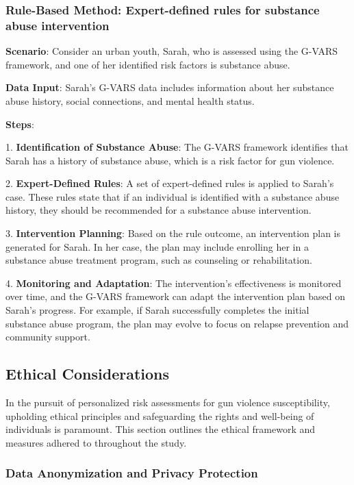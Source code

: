 \documentclass[11pt]{article}
\begin{document}
\subsubsection*{Rule-Based Method: Expert-defined rules for substance abuse intervention}

\textbf{Scenario}: Consider an urban youth, Sarah, who is assessed using the \textsf{G-VARS} framework, and one of her identified risk factors is substance abuse.

\textbf{Data Input}: Sarah's \textsf{G-VARS} data includes information about her substance abuse history, social connections, and mental health status.

\textbf{Steps}:

1. \textbf{Identification of Substance Abuse}: The \textsf{G-VARS} framework identifies that Sarah has a history of substance abuse, which is a risk factor for gun violence.

2. \textbf{Expert-Defined Rules}: A set of expert-defined rules is applied to Sarah's case. These rules state that if an individual is identified with a substance abuse history, they should be recommended for a substance abuse intervention.

3. \textbf{Intervention Planning}: Based on the rule outcome, an intervention plan is generated for Sarah. In her case, the plan may include enrolling her in a substance abuse treatment program, such as counseling or rehabilitation.

4. \textbf{Monitoring and Adaptation}: The intervention's effectiveness is monitored over time, and the \textsf{G-VARS} framework can adapt the intervention plan based on Sarah's progress. For example, if Sarah successfully completes the initial substance abuse program, the plan may evolve to focus on relapse prevention and community support.


\subsection{Ethical Considerations}\label{ethics}

In the pursuit of personalized risk assessments for gun violence susceptibility, upholding ethical principles and safeguarding the rights and well-being of individuals is paramount. This section outlines the ethical framework and measures adhered to throughout the study.

\subsubsection{Data Anonymization and Privacy Protection}
\end{document}
